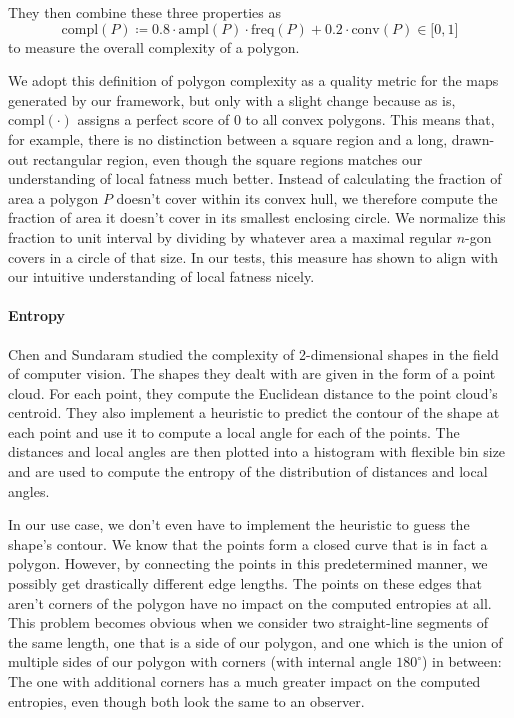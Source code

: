 They then combine these three properties as
\begin{equation}
\text{compl}(P) \coloneqq
0.8 \cdot \text{ampl}(P) \cdot \text{freq}(P) + 0.2 \cdot \text{conv}(P)
\in \lbrack0,1\rbrack
\end{equation}
%
to measure the overall complexity of a polygon.

We adopt this definition of polygon complexity as a quality metric for the maps generated by our framework, but only with a slight change because as is, $\text{compl}(\cdot)$ assigns a perfect score of $0$ to all convex polygons.
This means that, for example, there is no distinction between a square region and a long, drawn-out rectangular region, even though the square regions matches our understanding of local fatness much better.
Instead of calculating the fraction of area a polygon $P$ doesn't cover within its convex hull, we therefore compute the fraction of area it doesn't cover in its smallest enclosing circle.
We normalize this fraction to unit interval by dividing by whatever area a maximal regular $n$-gon covers in a circle of that size.
In our tests, this measure has shown to align with our intuitive understanding of local fatness nicely.



\paragraph{Entropy}

Chen and Sundaram \cite{chen2005estimating} studied the complexity of 2-dimensional shapes in the field of computer vision.
The shapes they dealt with are given in the form of a point cloud.
For each point, they compute the Euclidean distance to the point cloud's centroid.
They also implement a heuristic to predict the contour of the shape at each point and use it to compute a local angle for each of the points.
The distances and local angles are then plotted into a histogram with flexible bin size and are used to compute the entropy of the distribution of distances and local angles.

In our use case, we don't even have to implement the heuristic to guess the shape's contour.
We know that the points form a closed curve that is in fact a polygon.
However, by connecting the points in this predetermined manner, we possibly get drastically different edge lengths.
The points on these edges that aren't corners of the polygon have no impact on the computed entropies at all.
This problem becomes obvious when we consider two straight-line segments of the same length, one that is a side of our polygon, and one which is the union of multiple sides of our polygon with corners (with internal angle $180^\circ$) in between:
The one with additional corners has a much greater impact on the computed entropies, even though both look the same to an observer.


